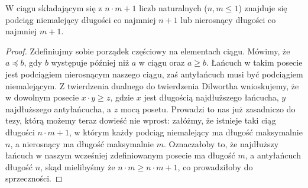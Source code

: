 \begin{theorem}
	W ciągu składającym się z $n \cdot m + 1$ liczb naturalnych ($n,m \leq 1$) znajduje się podciąg niemalejący długości co najmniej $n + 1$ lub nierosnący długości co najmniej $m + 1$.
\end{theorem}

\begin{proof}
	Zdefiniujmy sobie porządek częściowy na elementach ciągu. Mówimy, że $a \preceq b$, gdy $b$ występuje później niż $a$ w ciągu oraz $a \geq b$. Łańcuch w takim posecie jest podciągiem nierosnącym naszego ciągu, zaś antyłańcuch musi być podciągiem niemalejącym. Z twierdzenia dualnego do twierdzenia Dilwortha wnioskujemy, że w dowolnym posecie $x \cdot y \geq z$, gdzie $x$ jest długością najdłuższego łańcucha, $y$ najdłuższego antyłańcucha, a $z$ mocą posetu. Prowadzi to nas już zasadniczo do tezy, którą możemy teraz dowieść nie wprost: załóżmy, że istnieje taki ciąg długości $n \cdot m + 1$, w którym każdy podciąg niemalejący ma długość maksymalnie $n$, a nierosnący ma długość maksymalnie $m$. Oznaczałoby to, że najdłuższy łańcuch w naszym wcześniej zdefiniowanym posecie ma długość $m$, a antyłańcuch długość $n$, skąd mielibyśmy że $n \cdot m \geq n \cdot m + 1$, co prowadziłoby do sprzeczności.
\end{proof}
